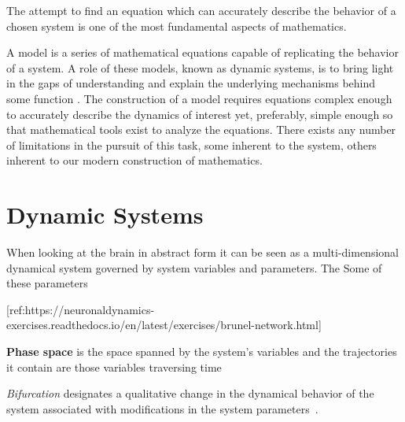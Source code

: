 \documentclass[../../Orator.tex]{subfiles}
\begin{document}
The attempt to find an equation which can accurately describe the behavior of a chosen system is one of the most fundamental aspects of mathematics.

A model is a series of mathematical equations capable of replicating the behavior of a system. A role of these models, known as dynamic systems, is to bring light in the gaps of understanding and explain the underlying mechanisms behind some function \citelater. 
The construction of a model requires equations complex enough to accurately describe the dynamics of interest yet, preferably, simple enough so that mathematical tools exist to analyze the equations\footnotemark. 
There exists any number of limitations in the pursuit of this task, some inherent to the system, others inherent to our modern construction of mathematics.

\section{Dynamic Systems}

When looking at the brain in abstract form it can be seen as a multi-dimensional dynamical system governed by system variables and parameters.
The 
Some of these parameters

\begin{split}\left[\begin{array}{ccll}
{\displaystyle \frac{du}{dt}} &=& u\left(1-u^{2}\right)-w+I \equiv F(u,w)\\[.2cm]
{\displaystyle \frac{dw}{dt}} &=& \varepsilon \left(u -0.5w+1\right) \equiv \varepsilon G(u,w)\, ,\\
\end{array}\right.\end{split}
[ref:https://neuronaldynamics-exercises.readthedocs.io/en/latest/exercises/brunel-network.html]

\textbf{Phase space} is the space spanned by the system's variables and the trajectories it contain are those variables traversing time

\textit{Bifurcation} designates a qualitative change in the dynamical behavior of the system associated with modifications in the system parameters~\cite{STEFANESCU2012748}.
\end{document}
